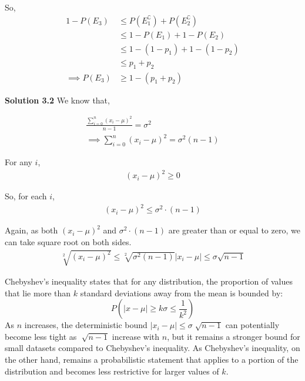 \begin{tcolorbox}[breakable]
\begin{sol}
		So,
		\begin{align}
			1-P(E_3)        & \leq P(E_1^\complement) + P(E_2^\complement) \\
			                & \leq 1-P(E_1) + 1-P(E_2)                     \\
			                & \leq 1-(1-p_1) + 1-(1-p_2)                   \\
			                & \leq p_1 +p_2                                \\
			\implies P(E_3) & \geq 1-(p_1+p_2)
		\end{align}


		\textbf{Solution 3.2}
		We know that,

		\begin{align}
			\frac{\sum^n_{i=0}(x_i-\mu)^2}{n-1}=\sigma^2 \\
			\implies \sum^n_{i=0}(x_i-\mu)^2 = \sigma^2(n-1)
		\end{align}

		For any $i$,
		\begin{align}
			(x_i-\mu)^2\geq0
		\end{align}

		So, for each $i$,
		\begin{align}
			(x_i-\mu)^2\leq\sigma^2\cdot(n-1)
		\end{align}

		Again, as both $(x_i-\mu)^2$ and $\sigma^2\cdot(n-1)$ are
		greater than or equal to zero, we can take square root on both
		sides.
		\begin{align}
			\sqrt[2]{(x_i-\mu)^2}\leq\sqrt[2]{\sigma^2(n-1)}
			|x_i-\mu|\leq\sigma\sqrt{n-1}
		\end{align}

		Chebyshev's inequality states that for any distribution, the
		proportion of values that lie more than $k$ standard deviations
		away from the mean is bounded by: \[P(|x-\mu | \geq k\sigma\leq
			\frac{1}{k^2})\] As $n$ increases, the deterministic bound
		$|x_i-\mu|\leq \sigma\sqrt[]{n-1}$ can potentially become less
		tight as $\sqrt[]{n-1}$ increase with $n$, but it remains a
		stronger bound for small datasets compared to Chebyshev's
		inequality. As Chebyshev's inequality, on the other hand,
		remains a probabilistic statement that applies to a portion of
		the distribution and becomes less restrictive for larger values
		of $k$.
	\end{sol}
\end{tcolorbox}
